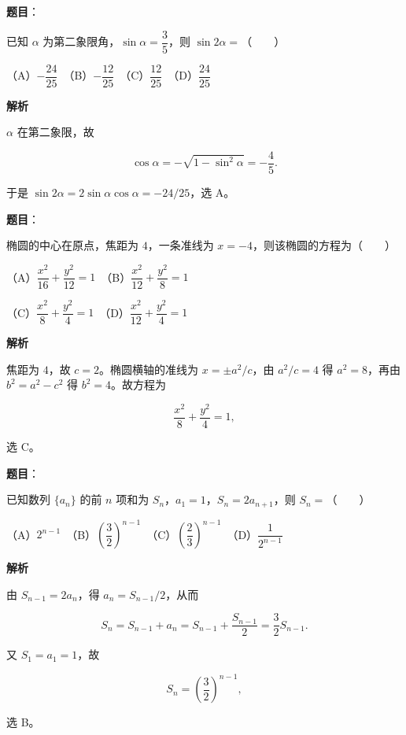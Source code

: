 \begin{answer}

\textbf{题目}：

已知 $\alpha$ 为第二象限角，$\sin\alpha=\dfrac35$，则 $\sin2\alpha=$\mbox{（　　）}

（A）$-\dfrac{24}{25}$　（B）$-\dfrac{12}{25}$　（C）$\dfrac{12}{25}$　（D）$\dfrac{24}{25}$

\textbf{解析}

$\alpha$ 在第二象限，故

\nopagebreak[4]
\[
\cos\alpha=-\sqrt{1-\sin^2\alpha}=-\frac45.
\]

于是 $\sin2\alpha=2\sin\alpha\cos\alpha=-24/25$，选 A。


\end{answer}
\begin{answer}

\textbf{题目}：

椭圆的中心在原点，焦距为 $4$，一条准线为 $x=-4$，则该椭圆的方程为\mbox{（　　）}

（A）$\dfrac{x^2}{16}+\dfrac{y^2}{12}=1$　（B）$\dfrac{x^2}{12}+\dfrac{y^2}{8}=1$

（C）$\dfrac{x^2}{8}+\dfrac{y^2}{4}=1$　（D）$\dfrac{x^2}{12}+\dfrac{y^2}{4}=1$

\textbf{解析}

焦距为 $4$，故 $c=2$。椭圆横轴的准线为 $x=\pm a^2/c$，由 $a^2/c=4$ 得 $a^2=8$，再由 $b^2=a^2-c^2$ 得 $b^2=4$。故方程为

\nopagebreak[4]
\[
\frac{x^2}{8}+\frac{y^2}{4}=1,
\]

选 C。


\end{answer}
\begin{answer}

\textbf{题目}：

已知数列 $\{a_n\}$ 的前 $n$ 项和为 $S_n$，$a_1=1$，$S_n=2a_{n+1}$，则 $S_n=$\mbox{（　　）}

（A）$2^{n-1}$　（B）$\left(\dfrac32\right)^{n-1}$　（C）$\left(\dfrac23\right)^{n-1}$　（D）$\dfrac1{2^{n-1}}$

\textbf{解析}

由 $S_{n-1}=2a_n$，得 $a_n=S_{n-1}/2$，从而

\nopagebreak[4]
\[
S_n=S_{n-1}+a_n
=S_{n-1}+\frac{S_{n-1}}2
=\frac32S_{n-1}.
\]

又 $S_1=a_1=1$，故

\nopagebreak[4]
\[
S_n=\left(\frac32\right)^{n-1},
\]

选 B。


\end{answer}
